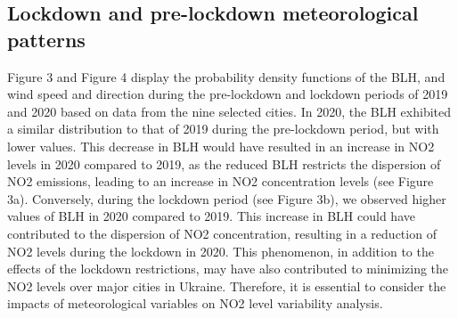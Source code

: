 \subsection{Lockdown and pre-lockdown meteorological patterns}
Figure 3 and Figure 4 display the probability density functions of the BLH, and wind speed and direction during the pre-lockdown and lockdown periods of 2019 and 2020 based on data from the nine selected cities. In 2020, the BLH exhibited a similar distribution to that of 2019 during the pre-lockdown period, but with lower values. This decrease in BLH would have resulted in an increase in NO2 levels in 2020 compared to 2019, as the reduced BLH restricts the dispersion of NO2 emissions, leading to an increase in NO2 concentration levels (see Figure 3a). Conversely, during the lockdown period (see Figure 3b), we observed higher values of BLH in 2020 compared to 2019. This increase in BLH could have contributed to the dispersion of NO2 concentration, resulting in a reduction of NO2 levels during the lockdown in 2020. This phenomenon, in addition to the effects of the lockdown restrictions, may have also contributed to minimizing the NO2 levels over major cities in Ukraine. Therefore, it is essential to consider the impacts of meteorological variables on NO2 level variability analysis.\par

